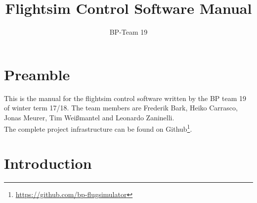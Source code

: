 \documentclass[accentcolor=tud1a, paper=a4, colorback]{tudreport}
\title{Flightsim Control Software Manual}
\subtitle{BP-Team 19}
\begin{document}
	\maketitle
	\tableofcontents

	\todototoc
	\listoftodos

	\chapter{Preamble}
	This is the manual for the flightsim control software written by the BP team 19
	of winter term 17/18. The team members are
	Frederik Bark, Heiko Carrasco, Jonas Meurer, Tim Weißmantel and Leonardo Zaninelli.
	\\
	The complete project infrastructure can be found on 
	Github\footnote{\url{https://github.com/bp-flugsimulator}}.

	\chapter{Introduction}
\end{document}

